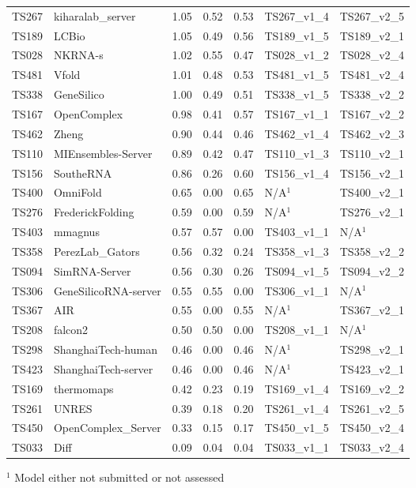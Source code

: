\begin{table}[ht]
{\begin{tabular}{llrrrll}
TS267 & kiharalab\_server & 1.05 & 0.52 & 0.53 & TS267\_v1\_4 & TS267\_v2\_5 \\ 
TS189 & LCBio & 1.05 & 0.49 & 0.56 & TS189\_v1\_5 & TS189\_v2\_1 \\ 
TS028 & NKRNA-s & 1.02 & 0.55 & 0.47 & TS028\_v1\_2 & TS028\_v2\_4 \\ 
TS481 & Vfold & 1.01 & 0.48 & 0.53 & TS481\_v1\_5 & TS481\_v2\_4 \\ 
TS338 & GeneSilico & 1.00 & 0.49 & 0.51 & TS338\_v1\_5 & TS338\_v2\_2 \\ 
TS167 & OpenComplex & 0.98 & 0.41 & 0.57 & TS167\_v1\_1 & TS167\_v2\_2 \\ 
TS462 & Zheng & 0.90 & 0.44 & 0.46 & TS462\_v1\_4 & TS462\_v2\_3 \\ 
TS110 & MIEnsembles-Server & 0.89 & 0.42 & 0.47 & TS110\_v1\_3 & TS110\_v2\_1 \\ 
TS156 & SoutheRNA & 0.86 & 0.26 & 0.60 & TS156\_v1\_4 & TS156\_v2\_1 \\ 
TS400 & OmniFold & 0.65 & 0.00 & 0.65 & N/A$^{1}$ & TS400\_v2\_1 \\ 
TS276 & FrederickFolding & 0.59 & 0.00 & 0.59 & N/A$^{1}$ & TS276\_v2\_1 \\ 
TS403 & mmagnus & 0.57 & 0.57 & 0.00 & TS403\_v1\_1 & N/A$^{1}$ \\ 
TS358 & PerezLab\_Gators & 0.56 & 0.32 & 0.24 & TS358\_v1\_3 & TS358\_v2\_2 \\ 
TS094 & SimRNA-Server & 0.56 & 0.30 & 0.26 & TS094\_v1\_5 & TS094\_v2\_2 \\ 
TS306 & GeneSilicoRNA-server & 0.55 & 0.55 & 0.00 & TS306\_v1\_1 & N/A$^{1}$ \\ 
TS367 & AIR & 0.55 & 0.00 & 0.55 & N/A$^{1}$ & TS367\_v2\_1 \\ 
TS208 & falcon2 & 0.50 & 0.50 & 0.00 & TS208\_v1\_1 & N/A$^{1}$ \\ 
TS298 & ShanghaiTech-human & 0.46 & 0.00 & 0.46 & N/A$^{1}$ & TS298\_v2\_1 \\ 
TS423 & ShanghaiTech-server & 0.46 & 0.00 & 0.46 & N/A$^{1}$ & TS423\_v2\_1 \\ 
TS169 & thermomaps & 0.42 & 0.23 & 0.19 & TS169\_v1\_4 & TS169\_v2\_2 \\ 
TS261 & UNRES & 0.39 & 0.18 & 0.20 & TS261\_v1\_4 & TS261\_v2\_5 \\ 
TS450 & OpenComplex\_Server & 0.33 & 0.15 & 0.17 & TS450\_v1\_5 & TS450\_v2\_4 \\ 
TS033 & Diff & 0.09 & 0.04 & 0.04 & TS033\_v1\_1 & TS033\_v2\_4 \\ 
\bottomrule
\end{tabular}%
}
\begin{flushleft}\footnotesize $^{1}$ Model either not submitted or not assessed\end{flushleft}
\end{table}
